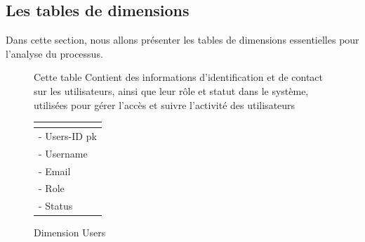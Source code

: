 \subsection{Les tables de dimensions}
Dans cette section, nous allons présenter les tables de dimensions essentielles pour l'analyse du processus.\\

\begin{figure}[htbp]
    \centering
    \begin{minipage}{0.60\textwidth}


        Cette table Contient des informations d'identification et de contact sur les utilisateurs, ainsi que leur rôle et statut dans le système, utilisées pour gérer l'accès et suivre l'activité des utilisateurs


    \end{minipage}
    \hfill
    \begin{minipage}{0.38\textwidth}

        \renewcommand{\arraystretch}{1.6}
        \centering
        \begin{tabular}{|p{4cm}|}
            \hline
            \textbf{\centering{Dim-Users}} \\
            \hline
            - Users-ID  pk                 \\

            - Username                     \\

            - Email                        \\

            - Role                         \\

            - Status                       \\
            \hline
        \end{tabular}

        \caption{Dimension Users}

    \end{minipage}
\end{figure}
